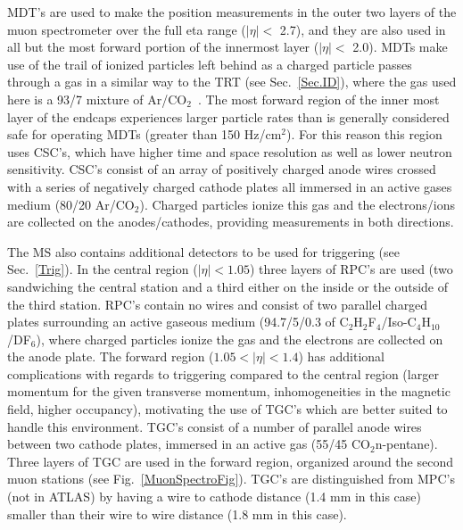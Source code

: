 \gls{MDT}'s are used to make the position measurements in the outer two layers of the muon spectrometer over the full eta range ($\mid\eta\mid<$ 2.7), and they are also used in all but the most forward portion of the innermost layer ($\mid\eta\mid<$ 2.0).  
MDTs make use of the trail of ionized particles left behind as a charged particle passes through a gas in a similar way to the TRT (see Sec.~\ref{Sec.ID}), where the gas used here is a 93/7 mixture of Ar/CO$_2$~\cite{JOIATLAS}.  
The most forward region of the inner most layer of the endcaps experiences larger particle rates than is generally considered safe for operating MDTs (greater than 150 Hz/cm$^2$).  
For this reason this region uses \gls{CSC}'s, which have higher time and space resolution as well as lower neutron sensitivity.  
\gls{CSC}'s consist of an array of positively charged anode wires crossed with a series of negatively charged cathode plates all immersed in an active gases medium (80/20 Ar/CO$_2$).  
Charged particles ionize this gas and the electrons/ions are collected on the anodes/cathodes, providing measurements in both directions.  

The MS also contains additional detectors to be used for triggering (see Sec.~\ref{Trig}).  
In the central region ($\mid\eta\mid < 1.05$) three layers of \gls{RPC}'s are used (two sandwiching the central station and a third either on the inside or the outside of the third station.  
\gls{RPC}'s contain no wires and consist of two parallel charged plates surrounding an active gaseous medium (94.7/5/0.3 of C$_2$H$_2$F$_4$/Iso-C$_4$H$_10$/DF$_6$), where charged particles ionize the gas and the electrons are collected on the anode plate.   
The forward region ($1.05<\mid\eta\mid < 1.4$) has additional complications with regards to triggering compared to the central region (larger momentum for the given transverse momentum, inhomogeneities in the magnetic field, higher occupancy), motivating the use of \gls{TGC}'s which are better suited to handle this environment.  
\gls{TGC}'s consist of a number of parallel anode wires between two cathode plates, immersed in an active gas (55/45 CO$_2$n-pentane).  
Three layers of TGC are used in the forward region, organized around the second muon stations (see Fig.~\ref{MuonSpectroFig}).  
\gls{TGC}'s are distinguished from \gls{MPC}'s (not in ATLAS) by having a wire to cathode distance (1.4 mm in this case) smaller than their wire to wire distance (1.8 mm in this case).  

 

